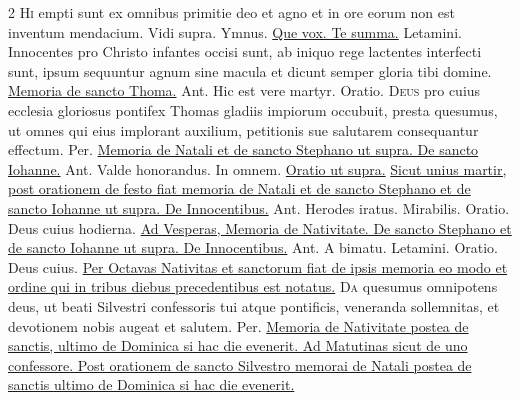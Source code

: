 \begin{multicols*}{2}
\lettrine[lines=2]{\zallmancaps \color{Blue} H}{i} empti sunt ex omnibus primitie deo et agno et in ore eorum non est inventum mendacium.
 Vidi supra. {\color{Red} Ymnus.} \hyperlink{que-vox-que-poterit}{Que vox. Te summa.} \V Letamini.
 Innocentes pro Christo infantes occisi sunt, ab iniquo rege lactentes interfecti sunt, ipsum sequuntur agnum sine macula et dicunt semper gloria tibi domine.
\newline \ul{Memoria de sancto Thoma.} {\color{Red} Ant.} Hic est vere martyr. {\color{Red} Oratio.}
\lettrine[lines=2]{\zallmancaps \color{Red} D}{eus} pro cuius ecclesia gloriosus pontifex Thomas gladiis impiorum occubuit, presta quesumus, ut omnes qui eius implorant auxilium, petitionis sue salutarem consequantur effectum. Per.
\newline \ul{Memoria de Natali et de sancto Stephano ut supra. De sancto Iohanne.} {\color{Red} Ant.} Valde honorandus. \V In omnem. \ul{Oratio ut supra.}
{\color{Red} }
 \ul{Sicut unius martir, post orationem de festo fiat memoria de Natali et de sancto Stephano et de sancto Iohanne ut supra. De Innocentibus.} {\color{Red} Ant.} Herodes iratus. \V Mirabilis. {\color{Red} Oratio.} Deus cuius hodierna.
\newline \ul{Ad Vesperas, Memoria de Nativitate. De sancto Stephano et de sancto Iohanne ut supra. De Innocentibus.} {\color{Red} Ant.} A bimatu. \V Letamini. {\color{Red} Oratio.} Deus cuius.
\newline \ul{Per Octavas Nativitas et sanctorum fiat de ipsis memoria eo modo et ordine qui in tribus diebus precedentibus est notatus.}
{\color{Red} }
\lettrine[lines=2]{\zallmancaps \color{Blue} D}{a} quesumus omnipotens deus, ut beati Silvestri confessoris tui atque pontificis, veneranda sollemnitas, et devotionem nobis augeat et salutem. Per.
\newline \ul{Memoria de Nativitate postea de sanctis, ultimo de Dominica si hac die evenerit. Ad Matutinas sicut de uno confessore. Post orationem de sancto Silvestro memorai de Natali postea de sanctis ultimo de Dominica si hac die evenerit.}

\end{multicols*}
